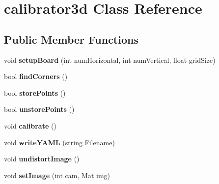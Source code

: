 \hypertarget{classcalibrator3d}{}\section{calibrator3d Class Reference}
\label{classcalibrator3d}
\subsection*{Public Member Functions}
\begin{DoxyCompactItemize}
\item 
void {\bfseries setup\+Board} (int num\+Horizontal, int num\+Vertical, float grid\+Size)\hypertarget{classcalibrator3d_aecb62318e30c38f8b2204596ea9ec9ee}{}\label{classcalibrator3d_aecb62318e30c38f8b2204596ea9ec9ee}

\item 
bool {\bfseries find\+Corners} ()\hypertarget{classcalibrator3d_ab9d0a808ef3aa58e82079b6f97e512b0}{}\label{classcalibrator3d_ab9d0a808ef3aa58e82079b6f97e512b0}

\item 
bool {\bfseries store\+Points} ()\hypertarget{classcalibrator3d_af42cc19f1960c3a56dcb7f9ccdfeae29}{}\label{classcalibrator3d_af42cc19f1960c3a56dcb7f9ccdfeae29}

\item 
bool {\bfseries unstore\+Points} ()\hypertarget{classcalibrator3d_a46bdca4abe7a6e489092d01c85616211}{}\label{classcalibrator3d_a46bdca4abe7a6e489092d01c85616211}

\item 
void {\bfseries calibrate} ()\hypertarget{classcalibrator3d_a80e384f11c6a626ecc2872de97bf1724}{}\label{classcalibrator3d_a80e384f11c6a626ecc2872de97bf1724}

\item 
void {\bfseries write\+Y\+A\+ML} (string Filename)\hypertarget{classcalibrator3d_ab6ec3752c125a089ee5c595fce7d8e43}{}\label{classcalibrator3d_ab6ec3752c125a089ee5c595fce7d8e43}

\item 
void {\bfseries undistort\+Image} ()\hypertarget{classcalibrator3d_a52aa09a9535d0d59134bb2d552b14b50}{}\label{classcalibrator3d_a52aa09a9535d0d59134bb2d552b14b50}

\item 
void {\bfseries set\+Image} (int cam, Mat img)\hypertarget{classcalibrator3d_aada8c2f3bd578c79892ab90a3a443aa2}{}\label{classcalibrator3d_aada8c2f3bd578c79892ab90a3a443aa2}


\end{DoxyCompactItemize}
